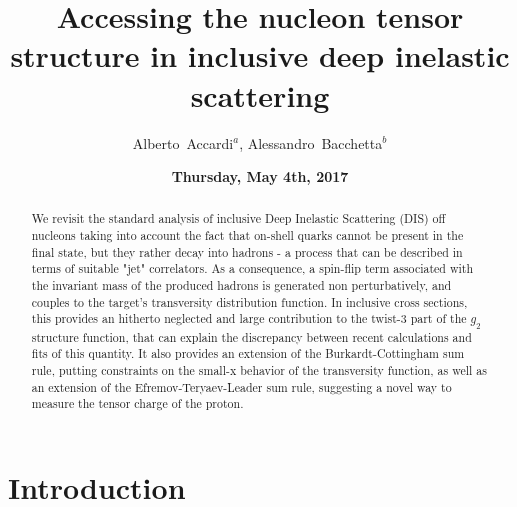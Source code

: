 \documentclass[preprintnumbers,floatfix,nofootinbib]{revtex4}
\begin{document}


\title{Accessing the nucleon tensor structure in inclusive deep inelastic scattering} 

\author{Alberto~Accardi$^{a}$, Alessandro~Bacchetta$^{b}$} 

\date{\bf Thursday, May 4th, 2017}

\begin{abstract}
We revisit the standard analysis of inclusive Deep Inelastic Scattering (DIS)
off nucleons taking into  account the fact that on-shell quarks cannot be present in the final state, but they rather decay into hadrons -  a process that can be described in terms of suitable "jet" correlators. As a consequence, a spin-flip term
associated with the invariant mass of the produced hadrons is generated
non perturbatively, and couples to the target's transversity distribution
function. In inclusive cross sections, this provides an hitherto neglected and
large contribution to the twist-3 part of the $g_2$ structure function, that
can explain the discrepancy between recent calculations and fits of this
quantity.  It also provides an extension of the Burkardt-Cottingham sum rule, putting constraints on the small-x behavior of the transversity function, as well as an extension of the Efremov-Teryaev-Leader sum rule, suggesting a novel way to measure the tensor charge of the proton.
\end{abstract}



\maketitle


\section{Introduction}
\end{document}
